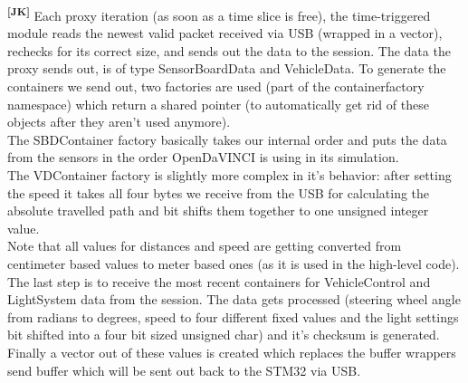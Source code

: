 \noindent
\textsuperscript{\textbf{[JK]}}
Each proxy iteration (as soon as a time slice is free), the time-triggered
module reads the newest valid packet received via USB (wrapped in a vector),
rechecks for its correct size, and sends out the data to the session. The data
the proxy sends out, is of type SensorBoardData and VehicleData. To generate the
containers we send out, two factories are used (part of the containerfactory
namespace) which return a shared pointer (to automatically get rid of these
objects after they aren't used anymore).\\
The SBDContainer factory basically takes our internal order and puts the data
from the sensors in the order OpenDaVINCI is using in its simulation.\\
The VDContainer factory is slightly more complex in it's behavior: after setting
the speed it takes all four bytes we receive from the USB for calculating the
absolute travelled path and bit shifts them together to one unsigned integer
value.\\
Note that all values for distances and speed are getting converted from
centimeter based values to meter based ones (as it is used in the high-level
code).\\
The last step is to receive the most recent containers for VehicleControl and
LightSystem data from the session. The data gets processed (steering wheel angle
from radians to degrees, speed to four different fixed values and the light
settings bit shifted into a four bit sized unsigned char) and it's checksum is
generated. Finally a vector out of these values is created which replaces the
buffer wrappers send buffer which will be sent out back to the STM32 via USB.\\

